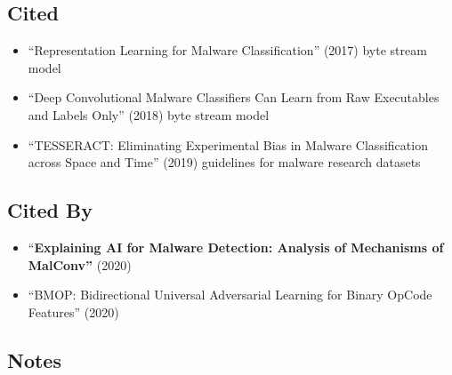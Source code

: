 \documentclass{article}
\begin{document}
\subsection*{Cited}
\begin{itemize}
	\item ``Representation Learning for Malware Classification'' (2017) byte stream model
	\item ``Deep Convolutional Malware Classifiers Can Learn from Raw Executables and Labels Only'' (2018) byte stream model
	\item ``TESSERACT: Eliminating Experimental Bias in Malware Classification across Space and Time'' (2019) guidelines for malware research datasets
\end{itemize}

\subsection*{Cited By}
\begin{itemize}
	\item ``\textbf{Explaining AI for Malware Detection: Analysis of Mechanisms of MalConv''} (2020)
	\item ``BMOP: Bidirectional Universal Adversarial Learning for Binary OpCode Features'' (2020)
\end{itemize}

\subsection*{Notes}
\end{document}
